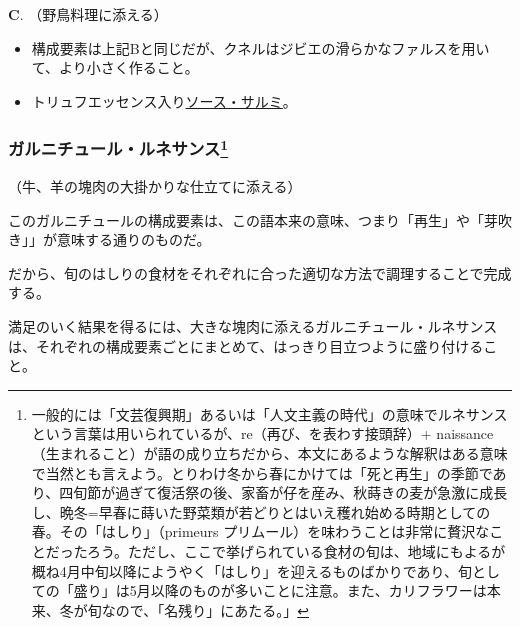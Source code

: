 \begin{recette}
\textbf{C}. （野鳥料理に添える）

\begin{itemize}
\item
  構成要素は上記Bと同じだが、クネルはジビエの滑らかなファルスを用いて、より小さく作ること。
\item
  トリュフエッセンス入り\protect\hyperlink{sauce-salmis}{ソース・サルミ}。
\end{itemize}

\atoaki{}

\hypertarget{garniture-renaissance}{%
\subsubsection[ガルニチュール・ルネサンス]{\texorpdfstring{ガルニチュール・ルネサンス\footnote{一般的には「文芸復興期」あるいは「人文主義の時代」の意味でルネサンスという言葉は用いられているが、re（再び、を表わす接頭辞）+
  naissance
  （生まれること）が語の成り立ちだから、本文にあるような解釈はある意味で当然とも言えよう。とりわけ冬から春にかけては「死と再生」の季節であり、四旬節が過ぎて復活祭の後、家畜が仔を産み、秋蒔きの麦が急激に成長し、晩冬=早春に蒔いた野菜類が若どりとはいえ穫れ始める時期としての春。その「はしり」（primeurs
  プリムール）を味わうことは非常に贅沢なことだったろう。ただし、ここで挙げられている食材の旬は、地域にもよるが概ね4月中旬以降にようやく「はしり」を迎えるものばかりであり、旬としての「盛り」は5月以降のものが多いことに注意。また、カリフラワーは本来、冬が旬なので、「名残り」にあたる。」}}{ガルニチュール・ルネサンス}}\label{garniture-renaissance}}



（牛、羊の塊肉の大掛かりな仕立てに添える）

このガルニチュールの構成要素は、この語本来の意味、つまり「再生」や「芽吹き」」が意味する通りのものだ。

だから、旬のはしりの食材をそれぞれに合った適切な方法で調理することで完成する。

満足のいく結果を得るには、大きな塊肉に添えるガルニチュール・ルネサンスは、それぞれの構成要素ごとにまとめて、はっきり目立つように盛り付けること。


\end{recette}
